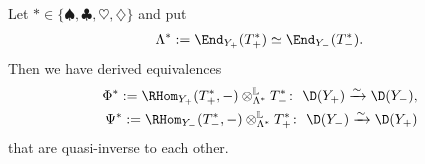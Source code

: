 \begin{Theorem}
Let $\ast \in \{ \spadesuit, \clubsuit, \heartsuit, \diamondsuit \}$ and put
\begin{gather*}
\Lambda^{\ast} := \End_{Y_+}(T_+^{\ast}) \simeq \End_{Y_-}(T_-^{\ast}).
\end{gather*}
Then we have derived equivalences
\begin{align*}
\Phi^{\ast} := \RHom_{Y_+}(T^{\ast}_+, -) \otimes^{\mathbb{L}}_{\Lambda^{\ast}} T_-^{\ast}\colon\ \D(Y_+) \xrightarrow{\sim} \D(Y_-), \\
\Psi^{\ast} := \RHom_{Y_-}(T^{\ast}_-, -) \otimes^{\mathbb{L}}_{\Lambda^{\ast}} T_+^{\ast}\colon\ \D(Y_-) \xrightarrow{\sim} \D(Y_+)
\end{align*}
that are quasi-inverse to each other.
\end{Theorem}
